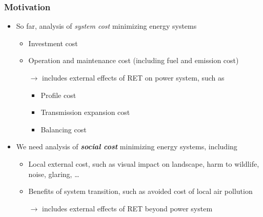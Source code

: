 \documentclass[aspectratio=1610, xcolor=dvipsnames,handout]{beamer} %
\begin{document}
    \begin{frame}
        \frametitle{Motivation}
        \begin{itemize}
            \item So far, analysis of \emph{system cost} minimizing energy systems
            \begin{itemize}
                \item Investment cost
                \item Operation and maintenance cost (including fuel and emission cost)
                \smallskip
                \item[$\rightarrow$] includes external effects of RET on power system, such as
                \begin{itemize}
                    \item Profile cost
                    \item Transmission expansion cost
                    \item Balancing cost
                \end{itemize}
            \end{itemize}
        \end{itemize}
        \medskip
        \begin{itemize}
            \item We need analysis of \textbf{\emph{social cost}} minimizing energy systems, including
            \begin{itemize}
                \item Local external cost, such as visual impact on landscape, harm to wildlife, noise, glaring, \ldots
                \item Benefits of system transition, such as avoided cost of local air pollution
                \item[$\rightarrow$] includes external effects of RET beyond power system
            \end{itemize}
        \end{itemize}
    \end{frame}
\end{document}
